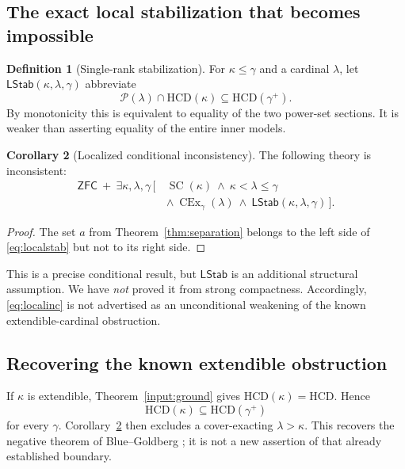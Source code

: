 \documentclass[11pt,letterpaper]{article}
\theoremstyle{definition}
\newtheorem{definition}{Definition}[section]
\newtheorem{corollary}[definition]{Corollary}
\newcommand{\ZFC}{\mathsf{ZFC}}
\newcommand{\SC}{\operatorname{SC}}
\newcommand{\CEx}{\operatorname{CEx}}
\newcommand{\HCD}{\mathrm{HCD}}
\newcommand{\Pow}{\mathcal{P}}
\newcommand{\LStab}{\mathsf{LStab}}
\begin{document}
\subsection{The exact local stabilization that becomes impossible}

\begin{definition}[Single-rank stabilization]\label{def:localstab}
For $\kappa\leq\gamma$ and a cardinal $\lambda$, let $\LStab(\kappa,\lambda,\gamma)$ abbreviate
\begin{equation}\label{eq:localstab}
       \Pow(\lambda)\cap\HCD(\kappa)\subseteq\HCD(\gamma^+).
\end{equation}
By monotonicity this is equivalent to equality of the two power-set sections. It is weaker than asserting equality of the entire inner models.
\end{definition}

\begin{corollary}[Localized conditional inconsistency]\label{cor:localinc}
The following theory is inconsistent:
\begin{equation}\label{eq:localinc}
\begin{split}
 \ZFC\ +\ \exists\kappa,\lambda,\gamma\,[\,&\SC(\kappa)\ \wedge\ \kappa<\lambda\leq\gamma\\
             &\wedge\ \CEx_\gamma(\lambda)
              \ \wedge\ \LStab(\kappa,\lambda,\gamma)\,].
\end{split}
\end{equation}
\end{corollary}

\begin{proof}
The set $a$ from Theorem~\ref{thm:separation} belongs to the left side of \eqref{eq:localstab} but not to its right side.
\end{proof}

This is a precise conditional result, but $\LStab$ is an additional structural assumption. We have \emph{not} proved it from strong compactness. Accordingly, \eqref{eq:localinc} is not advertised as an unconditional weakening of the known extendible-cardinal obstruction.

\subsection{Recovering the known extendible obstruction}

If $\kappa$ is extendible, Theorem~\ref{input:ground} gives $\HCD(\kappa)=\HCD$. Hence
\[
        \HCD(\kappa)\subseteq\HCD(\gamma^+)
\]
for every $\gamma$. Corollary~\ref{cor:localinc} then excludes a cover-exacting $\lambda>\kappa$. This recovers the negative theorem of Blue--Goldberg \cite[Theorem 3.6]{cover}; it is not a new assertion of that already established boundary.
\end{document}
